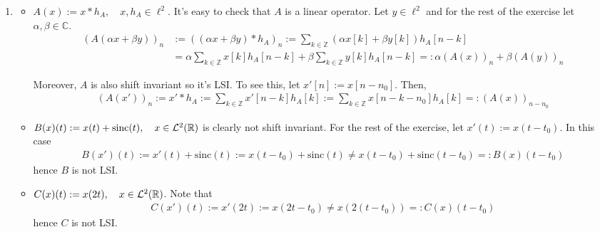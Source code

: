 \documentclass{article}
\begin{document}
    
    \begin{enumerate}[label=(\roman*)]
        \item
        \begin{itemize}
            \item $A(x):=x * h_A, \quad x, h_A\in \ell^2$. It's easy to check that $A$ is a linear operator. Let $y\in \ell^2$ and for the rest of the exercise let $\alpha, \beta \in \mathbb{C}$.
            \begin{align}
                (A(\alpha x + \beta y))_n&:=((\alpha x + \beta y) * h_A)_n := \sum_{k\in \mathbb{Z}} (\alpha x[k] + \beta y[k]) h_A[n-k]\\
                &=\alpha \sum_{k\in \mathbb{Z}} x[k]h_A[n-k] + \beta \sum_{k\in \mathbb{Z}} y[k] h_A[n-k] =: \alpha (A(x))_n + \beta (A(y))_n
            \end{align}
            
            Moreover, $A$ is also shift invariant so it's LSI. To see this, let $x'[n]:=x[n-n_0]$. Then,
            \begin{align}
                (A(x'))_n:= x' * h_A := \sum_{k\in \mathbb{Z}} x'[n-k] h_A[k] := \sum_{k\in \mathbb{Z}} x[n-k-n_0] h_A[k] =: (A(x))_{n-n_0}
            \end{align}
            \item $B(x)(t):=x(t)+\text{sinc}(t),\quad x\in \mathcal{L}^2(\mathbb{R})$ is clearly not shift invariant. For the rest of the exercise, let $x'(t):=x(t-t_0)$. In this case
            \begin{align}
                B(x')(t):=x'(t)+\text{sinc}(t):=x(t-t_0)+\text{sinc}(t)\neq x(t-t_0) + \text{sinc}(t-t_0)=: B(x)(t-t_0)
            \end{align}
            hence $B$ is not LSI.
            
            \item $C(x)(t):=x(2t),\quad x \in \mathcal{L}^2(\mathbb{R})$. Note that
            \begin{align}
                C(x')(t) := x'(2t) := x(2t-t_0)\neq x(2(t-t_0)) =: C(x)(t-t_0)
            \end{align}
            hence $C$ is not LSI.
            

\end{itemize}
\end{enumerate}
\end{document}
